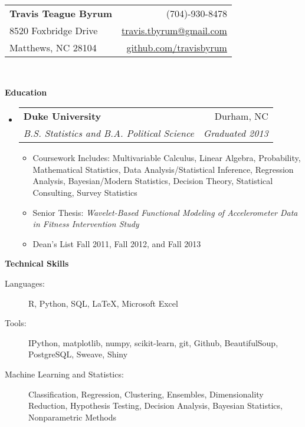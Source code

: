 \documentclass[letterpaper,11pt]{article}
\makeatletter
\newcommand{\resitem}[1]{\item #1 \vspace{-2pt}}
\newcommand{\resheading}[1]{{\large \colorbox{mygrey}{\begin{minipage}{\textwidth}{\textbf{#1 \vphantom{p\^{E}}}}\end{minipage}}}}
\newcommand{\ressubheading}[4]{
\begin{tabular*}{6.5in}{l@{\extracolsep{\fill}}r}
		\textbf{#1} & #2 \\
		\textit{#3} & \textit{#4} \\
\end{tabular*}\vspace{-6pt}}
\makeatother
\begin{document}
\newcommand{\mywebheader}{
\begin{tabular*}{7in}{l@{\extracolsep{\fill}}r}
	\textbf{\Large Travis Teague Byrum}  & (704)-930-8478\\
	8520 Foxbridge Drive & \href{mailto:travis.tbyrum@gmail.com}{travis.tbyrum@gmail.com} \\
	Matthews, NC 28104 & \href{https://github.com/travisbyrum}{github.com/travisbyrum}\\
\end{tabular*}
\\
\vspace{0.1in}}

\mywebheader

\resheading{Education}
	\begin{itemize}
		\item
			\ressubheading{Duke University}{Durham, NC}{B.S. Statistics and B.A. Political Science}{Graduated 2013}
				{ \footnotesize
				\begin{itemize}
					\resitem{Coursework Includes: Multivariable Calculus, Linear Algebra, Probability, Mathematical Statistics, Data Analysis/Statistical Inference, Regression Analysis, Bayesian/Modern Statistics, Decision Theory, Statistical Consulting, Survey Statistics}
					\resitem{Senior Thesis: \textit{Wavelet-Based Functional Modeling of Accelerometer Data in Fitness Intervention Study}} 
					\resitem{Dean's List Fall 2011, Fall 2012, and Fall 2013} 
				\end{itemize}
				}
	\end{itemize} %


\resheading{Technical Skills}
	\begin{description}
		\item[Languages:] { \footnotesize R, Python, SQL, \LaTeX, Microsoft Excel
		}
		\item[Tools:] { \footnotesize IPython, matplotlib, numpy, scikit-learn, git, Github, BeautifulSoup, PostgreSQL, Sweave, Shiny
		}
		\item[Machine Learning and Statistics:] { \footnotesize Classification, Regression, Clustering, Ensembles, Dimensionality Reduction, Hypothesis Testing, Decision Analysis, Bayesian Statistics, Nonparametric Methods
		}
	\end{description} %
\end{document}
